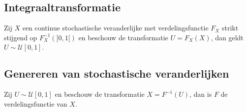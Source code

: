 \documentclass[main.tex]{subfiles}
\begin{document}
\subsection{Integraaltransformatie}
\label{sec:integr}

\begin{ei}
  \label{ei:integraaltransformatie}
  Zij $X$ een continue stochastische veranderlijke met verdelingsfunctie $F_{X}$ strikt stijgend op $F_{X}^{-1}(]0,1[)$ en beschouw de transformatie $U=F_{X}(X)$, dan geldt $U \sim \mathcal{U}[0,1]$.
\end{ei}

\subsection{Genereren van stochastische veranderlijken}
\label{sec:gener-van-stoch}

\begin{ei}
  \label{ei:stochastische-veranderlijke-genereren}
  Zij $U \sim \mathcal{U}[0,1]$ en beschouw de transformatie $X = F^{-1}(U)$, dan is $F$ de verdelingsfunctie van $X$.
\end{ei}
\end{document}
